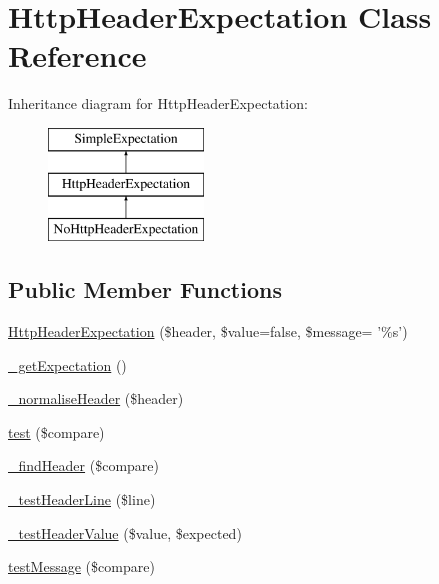 \hypertarget{class_http_header_expectation}{
\section{HttpHeaderExpectation Class Reference}
\label{class_http_header_expectation}
}
Inheritance diagram for HttpHeaderExpectation:\begin{figure}[H]
\begin{center}
\leavevmode
\includegraphics[height=3.000000cm]{class_http_header_expectation}
\end{center}
\end{figure}
\subsection*{Public Member Functions}
\begin{DoxyCompactItemize}
\item 
\hyperlink{class_http_header_expectation_aefc6e91171518d01a9b2dbc0a9885fcb}{HttpHeaderExpectation} (\$header, \$value=false, \$message= '\%s')
\item 
\hyperlink{class_http_header_expectation_ac77ecb228256b46964c46a7dfcbeb030}{\_\-getExpectation} ()
\item 
\hyperlink{class_http_header_expectation_a45f30ccc9cec011cd55f3bed48f45807}{\_\-normaliseHeader} (\$header)
\item 
\hyperlink{class_http_header_expectation_a22d6de67c863d5f596a90b64b4989637}{test} (\$compare)
\item 
\hyperlink{class_http_header_expectation_a8ddd193f67f36b80517dcd00c0c0a2c2}{\_\-findHeader} (\$compare)
\item 
\hyperlink{class_http_header_expectation_a088544f94d409d28df142ff0ca5dd146}{\_\-testHeaderLine} (\$line)
\item 
\hyperlink{class_http_header_expectation_a53fd1ae122651ea92db15820cf588329}{\_\-testHeaderValue} (\$value, \$expected)
\item 
\hyperlink{class_http_header_expectation_ac564586fb079247c33a04e6ead31f8cb}{testMessage} (\$compare)
\end{DoxyCompactItemize}
